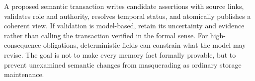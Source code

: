 A proposed semantic transaction writes candidate assertions with source links, validates role and authority, resolves temporal status, and atomically publishes a coherent view. If validation is model-based, retain its uncertainty and evidence rather than calling the transaction verified in the formal sense. For high-consequence obligations, deterministic fields can constrain what the model may revise. The goal is not to make every memory fact formally provable, but to prevent unexamined semantic changes from masquerading as ordinary storage maintenance.

